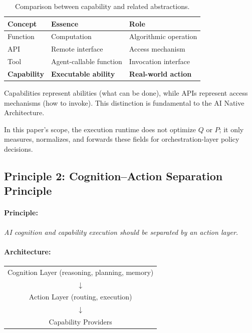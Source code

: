 \begin{table}[t]
\caption{Comparison between capability and related abstractions.}
\label{tab:capability-comparison}
\centering
\small
\begin{tabularx}{\linewidth}{@{} l X X @{}}
\toprule
Concept & Essence & Role \\
\midrule
Function & Computation & Algorithmic operation \\
API & Remote interface & Access mechanism \\
Tool & Agent-callable function & Invocation interface \\
\textbf{Capability} & \textbf{Executable ability} & \textbf{Real-world action} \\
\bottomrule
\end{tabularx}
\end{table}

Capabilities represent abilities (what can be done), while APIs represent access mechanisms (how to invoke). This distinction is fundamental to the AI Native Architecture.

In this paper's scope, the execution runtime does not optimize $Q$ or $P$; it only measures, normalizes, and forwards these fields for orchestration-layer policy decisions.

\subsection{Principle 2: Cognition--Action Separation Principle}

\paragraph{Principle:}
\emph{AI cognition and capability execution should be separated by an action layer.}

\paragraph{Architecture:}
\begin{center}
\begin{tabular}{c}
Cognition Layer (reasoning, planning, memory) \\
$\downarrow$ \\
Action Layer (routing, execution) \\
$\downarrow$ \\
Capability Providers
\end{tabular}
\end{center}

